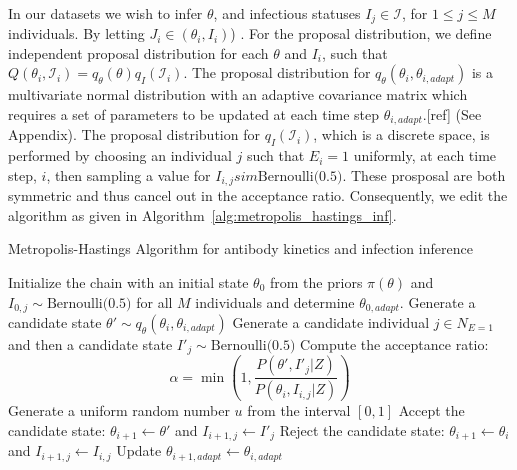 \documentclass{article}
\begin{document}
\paragraph{}In our datasets we wish to infer $\theta$, and infectious statuses ${I_j} \in \mathcal{I}$, for $1 \leq j \leq M$ individuals. By letting $J_i \in(\theta_i, I_i)$) . For the proposal distribution, we define independent proposal distribution for each $\theta$ and $I_i$,  such that $Q(\theta_i, \mathcal{I}_i) = q_\theta(\theta)q_I(\mathcal{I}_i)$. The proposal distribution for $q_\theta(\theta_i, \theta_{i, adapt})$ is a multivariate normal distribution with an adaptive covariance matrix which requires a set of parameters to be updated at each time step $\theta_{i, adapt}$.[ref] (See Appendix). The proposal distribution for $q_I(\mathcal{I}_i)$, which is a discrete space, is performed by choosing an individual $j$ such that $E_i = 1$ uniformly, at each time step, $i$, then sampling a value for $I_{i, j} sim \text{Bernoulli(0.5)}$. These prosposal are both symmetric and thus cancel out in the acceptance ratio. Consequently, we edit the algorithm as given in Algorithm~\ref{alg:metropolis_hastings_inf}.

\begin{algorithm}
\caption{Metropolis-Hastings Algorithm for antibody kinetics and infection inference}
\label{alg:metropolis_hastings_inf}
\begin{algorithmic}[1]
    \State Initialize the chain with an initial state $\theta_0$ from the priors $\pi(\theta)$ and $I_{0, j} \sim \text{Bernoulli(0.5)}$ for all $M$ individuals and determine $\theta_{0, adapt}$.
        \State Generate a candidate state $\theta' \sim q_\theta(\theta_i, \theta_{i, adapt})$
        \State Generate a candidate individual $j \in N_{E = 1} $ and then a candidate state $I'_j \sim \text{Bernoulli(0.5)}$
        \State Compute the acceptance ratio:
        \[
        \alpha = \min\left(1, \frac{P(\theta', I'_{j}|Z)}{P(\theta_i, I_{i, j}|Z)} \right)
        \]
        \State Generate a uniform random number $u$ from the interval $[0, 1]$
            \State Accept the candidate state: $\theta_{i+1} \leftarrow \theta'$ and $I_{i + 1, j}  \leftarrow I'_j$
        \Else
            \State Reject the candidate state: $\theta_{i+1} \leftarrow \theta_i$ and $I_{i + 1, j}  \leftarrow I_{i, j} $
        \EndIf 
        \State Update $\theta_{i + 1, adapt} \leftarrow \theta_{i, adapt}$
    \EndFor
\end{algorithmic} 
\end{algorithm}
\end{document}
